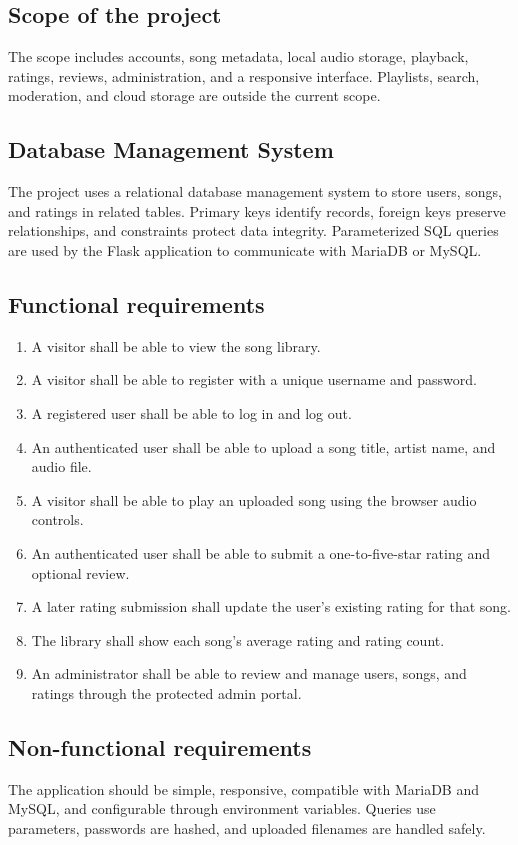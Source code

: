 \documentclass[12pt,a4paper]{article}
\begin{document}
\subsection{Scope of the project}
The scope includes accounts, song metadata, local audio storage, playback,
ratings, reviews, administration, and a responsive interface. Playlists,
search, moderation, and cloud storage are outside the current scope.

\subsection{Database Management System}
The project uses a relational database management system to store users, songs, and ratings in related tables. Primary keys identify records, foreign keys preserve relationships, and constraints protect data integrity. Parameterized SQL queries are used by the Flask application to communicate with MariaDB or MySQL.

\subsection{Functional requirements}
\begin{enumerate}[leftmargin=*]
  \item A visitor shall be able to view the song library.
  \item A visitor shall be able to register with a unique username and password.
  \item A registered user shall be able to log in and log out.
  \item An authenticated user shall be able to upload a song title, artist name, and audio file.
  \item A visitor shall be able to play an uploaded song using the browser audio controls.
  \item An authenticated user shall be able to submit a one-to-five-star rating and optional review.
  \item A later rating submission shall update the user's existing rating for that song.
  \item The library shall show each song's average rating and rating count.
  \item An administrator shall be able to review and manage users, songs, and
  ratings through the protected admin portal.
\end{enumerate}

\subsection{Non-functional requirements}
The application should be simple, responsive, compatible with MariaDB and MySQL, and configurable through environment variables. Queries use parameters, passwords are hashed, and uploaded filenames are handled safely.
\end{document}
